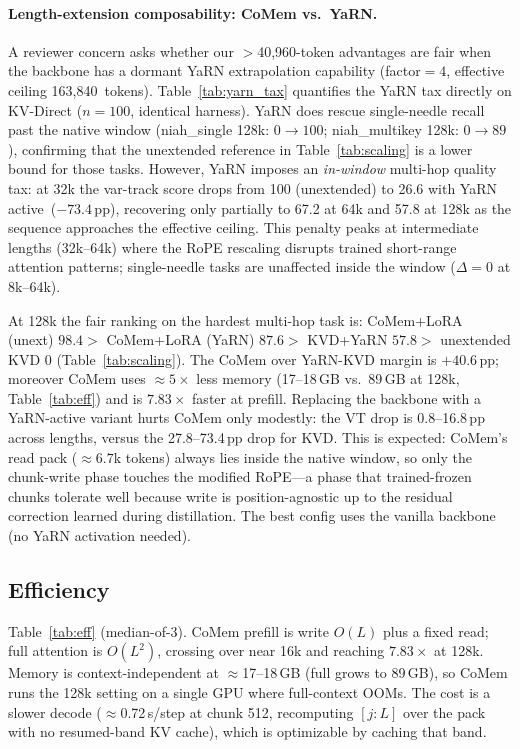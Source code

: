 

\paragraph{Length-extension composability: CoMem vs.\ YaRN.}
A reviewer concern asks whether our $>$40{,}960-token advantages are fair when
the backbone has a dormant YaRN extrapolation capability (factor$=4$, effective
ceiling 163{,}840~tokens). Table~\ref{tab:yarn_tax} quantifies the YaRN tax
directly on KV-Direct ($n{=}100$, identical harness). YaRN does rescue
single-needle recall past the native window (niah\_single 128k: $0\to100$;
niah\_multikey 128k: $0\to89$), confirming that the unextended reference in
Table~\ref{tab:scaling} is a lower bound for those tasks. However, YaRN
imposes an \emph{in-window} multi-hop quality tax: at 32k the var-track score
drops from 100 (unextended) to 26.6 with YaRN active~($-73.4$\,pp), recovering
only partially to 67.2 at 64k and 57.8 at 128k as the sequence approaches the
effective ceiling. This penalty peaks at intermediate lengths (32k--64k) where
the RoPE rescaling disrupts trained short-range attention patterns; single-needle
tasks are unaffected inside the window ($\Delta{=}0$ at 8k--64k).

At 128k the fair ranking on the hardest multi-hop task is:
CoMem+LoRA (unext) $98.4 >$ CoMem+LoRA (YaRN) $87.6 >$ KVD+YaRN $57.8 >$
unextended KVD $0$ (Table~\ref{tab:scaling}).
The CoMem over YaRN-KVD margin is $\mathbf{+40.6}$\,pp; moreover CoMem uses
${\approx}5\times$ less memory (17--18\,GB vs.\ 89\,GB at 128k,
Table~\ref{tab:eff}) and is $7.83\times$ faster at prefill.
Replacing the backbone with a YaRN-active variant hurts CoMem only modestly:
the VT drop is 0.8--16.8\,pp across lengths, versus the 27.8--73.4\,pp drop
for KVD. This is expected: CoMem's read pack (${\approx}6.7$k tokens) always
lies inside the native window, so only the chunk-write phase touches the
modified RoPE---a phase that trained-frozen chunks tolerate well because write
is position-agnostic up to the residual correction learned during distillation.
The best config uses the vanilla backbone (no YaRN activation needed).



\subsection{Efficiency}
Table~\ref{tab:eff} (median-of-3). CoMem prefill is write $O(L)$ plus a fixed
read; full attention is $O(L^2)$, crossing over near 16k and reaching
$7.83\times$ at 128k. Memory is context-independent at $\approx$17--18\,GB
(full grows to 89\,GB), so CoMem runs the 128k setting on a single GPU where
full-context OOMs. The cost is a slower decode ($\approx$0.72\,s/step at chunk
512, recomputing $[j{:}L]$ over the pack with no resumed-band KV cache), which is
optimizable by caching that band.

